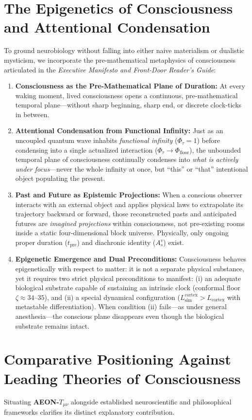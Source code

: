 \documentclass[11pt,a4paper]{article}
\begin{document}
\section{The Epigenetics of Consciousness and Attentional Condensation}
To ground neurobiology without falling into either naive materialism or dualistic mysticism, we incorporate the pre-mathematical metaphysics of consciousness articulated in the \emph{Executive Manifesto and Front-Door Reader's Guide}:
\begin{enumerate}
    \item \textbf{Consciousness as the Pre-Mathematical Plane of Duration:} At every waking moment, lived consciousness opens a continuous, pre-mathematical temporal plane—without sharp beginning, sharp end, or discrete clock-ticks in between.
    \item \textbf{Attentional Condensation from Functional Infinity:} Just as an uncoupled quantum wave inhabits \emph{functional infinity} ($\Phi_\tau = 1$) before condensing into a single actualized interaction ($\Phi_\tau \to \Phi_{\mathrm{floor}}$), the unbounded temporal plane of consciousness continually condenses into \emph{what is actively under focus}—never the whole infinity at once, but ``this'' or ``that'' intentional object populating the present.
    \item \textbf{Past and Future as Epistemic Projections:} When a conscious observer interacts with an external object and applies physical laws to extrapolate its trajectory backward or forward, those reconstructed pasts and anticipated futures are \emph{imagined projections} within consciousness, not pre-existing rooms inside a static four-dimensional block universe. Physically, only ongoing proper duration ($t_{\mathrm{pre}}$) and diachronic identity ($A_s^v$) exist.
    \item \textbf{Epigenetic Emergence and Dual Preconditions:} Consciousness behaves epigenetically with respect to matter: it is not a separate physical substance, yet it requires two strict physical preconditions to manifest: (i) an adequate biological substrate capable of sustaining an intrinsic clock (conformal floor $\zeta \approx 34$--$35$), and (ii) a special dynamical configuration ($L_{\mathrm{sim}}^{\mathrm{cortex}} > L_{\mathrm{cortex}}$ with metastable differentiation). When condition (ii) fails—as under general anesthesia—the conscious plane disappears even though the biological substrate remains intact.
\end{enumerate}

\section{Comparative Positioning Against Leading Theories of Consciousness}
Situating \textbf{AEON-$T_{\mu\nu}$} alongside established neuroscientific and philosophical frameworks clarifies its distinct explanatory contribution.
\end{document}
